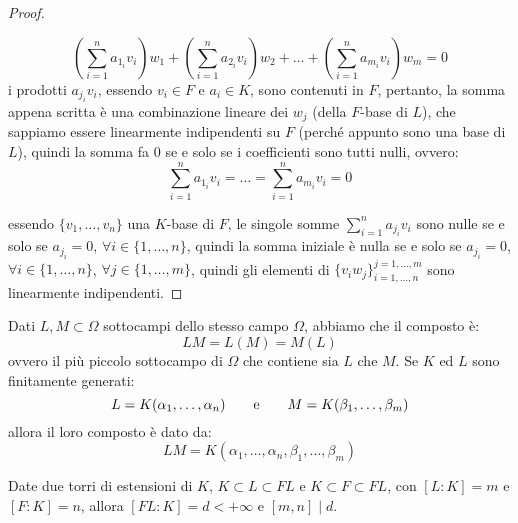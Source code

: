\documentclass[11pt]{scrartcl}
\begin{document}
\begin{proof}
\begin{itemize}
	\[ \left(\sum_{i=1}^{n} a_{1_i}v_i\right)w_1 +  \left(\sum_{i=1}^{n} a_{2_i}v_i\right)w_2 + \ldots +  \left(\sum_{i=1}^{n} a_{m_i}v_i\right)w_m = 0
	\]
    i prodotti $a_{j_i}v_i$, essendo $v_i \in F$ e $a_i \in K$, sono contenuti in $F$, pertanto, la somma appena scritta è una combinazione lineare dei $w_j$ (della $F$-base di $L$), che sappiamo essere linearmente indipendenti su $F$ (perché appunto sono una base di $L$), quindi la somma fa $0$ se e solo se i coefficienti sono tutti nulli, ovvero:
	\[ \sum_{i=1}^{n} a_{1_i}v_i =\ldots=\sum_{i=1}^{n} a_{m_i}v_i = 0
	\]
	\end{itemize}
    essendo $\{v_1,\ldots,v_n\}$ una $K$-base di $F$, le singole somme $\sum_{i=1}^{n} a_{j_i}v_i$ sono nulle se e solo se $a_{j_i} = 0$, $\forall i \in\{1,\ldots,n\}$, quindi la somma iniziale è nulla se e solo se $a_{j_i} = 0$, $\forall i \in\{1,\ldots,n\}$, $\forall j \in \{1,\ldots,m\}$, quindi gli elementi di $\{v_iw_j\}_{i=1,\ldots,n}^{j=1,\ldots,m}$ sono linearmente indipendenti.
\end{proof}

\pagebreak

\begin{remark}
    Dati $L,M \subset \Omega$ sottocampi dello stesso campo $\Omega$, abbiamo che il composto è:
    \[ LM = L(M) = M(L)
        \]
    ovvero il più piccolo sottocampo di $\Omega$ che contiene sia $L$ che $M$. Se $K$ ed $L$ sono finitamente generati:
    \[ L = K(\alpha_1,\ldots,\alpha_n) \qquad \text e \qquad M = K(\beta_1,\ldots,\beta_m)
        \]
    allora il loro composto è dato da:
    \[ LM = K(\alpha_1,\ldots,\alpha_n,\beta_1,\ldots,\beta_m)
        \]
\end{remark}

\begin{proposition}
    \label{3.9}
    Date due torri di estensioni di $K$, $K \subset L \subset FL$ e $K \subset F \subset FL$, con $[L:K] = m$ e $[F:K] = n$, allora $[FL:K] = d < +\infty$ e $[m,n] \mid d$.
\end{proposition}
\end{document}
